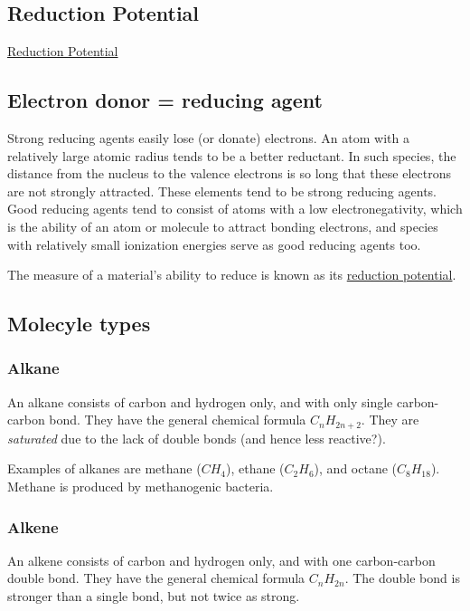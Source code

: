 \documentclass{article}
\begin{document}
\subsection{Reduction Potential}
\href{https://en.wikipedia.org/wiki/Table_of_standard_reduction_potentials_for_half-reactions_important_in_biochemistry}{Reduction
Potential}

\subsection{Electron donor = reducing agent}

Strong reducing agents easily lose (or donate) electrons. An atom with a relatively large
atomic radius tends to be a better reductant. In such species, the distance from the
nucleus to the valence electrons is so long that these electrons are not strongly
attracted. These elements tend to be strong reducing agents. Good reducing agents tend to
consist of atoms with a low electronegativity, which is the ability of an atom or molecule
to attract bonding electrons, and species with relatively small ionization energies serve
as good reducing agents too.

The measure of a material's ability to reduce is known as its
\href{https://en.wikipedia.org/wiki/Reduction_potential}{reduction potential}.


\subsection{Molecyle types}

\subsubsection{Alkane}

An alkane consists of carbon and hydrogen only, and with only single carbon-carbon bond.
They have the general chemical formula $C_{n}H_{2n+2}$. They are {\em saturated\/}
due to the lack of double bonds (and hence less reactive?).

Examples of alkanes are methane ($CH_4$), ethane ($C_2H_6$), and octane ($C_{8}H_{18}$).
Methane is produced by methanogenic bacteria.

\subsubsection{Alkene}

An alkene consists of carbon and hydrogen only, and with one carbon-carbon double bond.
They have the general chemical formula $C_{n}H_{2n}$. The double bond is stronger than
a single bond, but not twice as strong.
\end{document}
